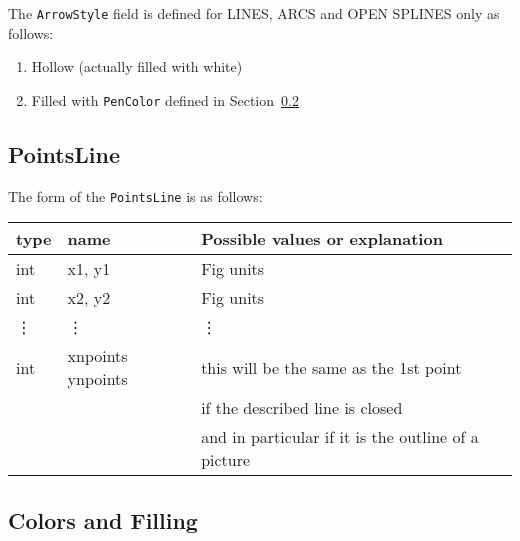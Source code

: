 \documentclass[10pt, a4paper]{article}
\begin{document}
The \texttt{ArrowStyle} field is defined for LINES, ARCS and OPEN SPLINES only 
as follows:
%
\begin{enumerate}
\item[0] Hollow (actually filled with white)
\item    Filled with \texttt{PenColor} defined in Section~\ref{subsec:paramColorsFill}
\end{enumerate}


\subsection{PointsLine}\label{subsec:paramPointsLine}

\noindent
The form of the \texttt{PointsLine} is as follows: \\
%
\begin{tabular}{lll}
\toprule
type    & name             & Possible values or explanation \\
\midrule
\midrule
int    & x1, y1            & Fig units \\
int    & x2, y2            & Fig units \\
\vdots & \vdots            &  \vdots    \\
int    & xnpoints ynpoints & this will be the same as the 1st point \\
       &                   & if the described line is closed \\
       &                   & and in particular if it is the outline of a picture \\
\bottomrule
\end{tabular}

\subsection{Colors and Filling}\label{subsec:paramColorsFill}
\end{document}
